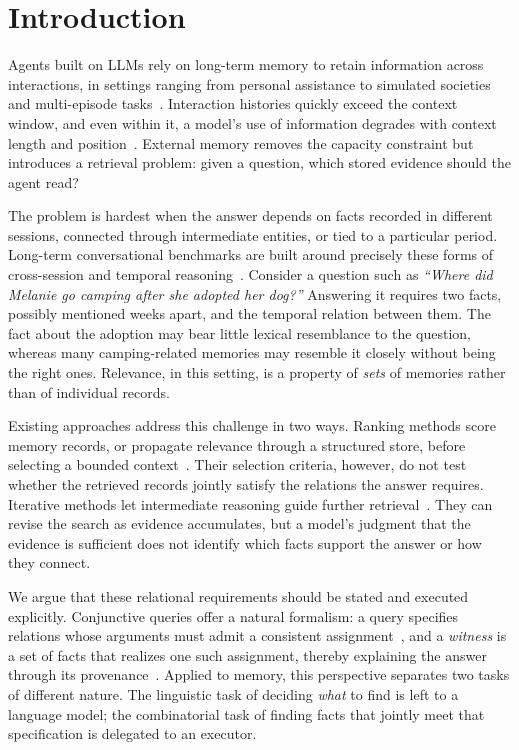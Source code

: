 \section{Introduction}
\label{sec:intro}

Agents built on \acp{LLM} rely on long-term memory to retain information
across interactions, in settings ranging from personal assistance to
simulated societies and multi-episode
tasks~\cite{park2023generative,packer2023memgpt,sumers2024coala,zhang2025survey}.
Interaction histories quickly exceed the context window, and even within
it, a model's use of information degrades with context length and
position~\cite{liu2024lost,hsieh2024ruler}. External memory removes the
capacity constraint but introduces a retrieval problem: given a question,
which stored evidence should the agent read?

The problem is hardest when the answer depends on facts recorded in
different sessions, connected through intermediate entities, or tied to
a particular period. Long-term conversational benchmarks are built
around precisely these forms of cross-session and temporal
reasoning~\cite{maharana2024locomo,wu2025longmemeval}. Consider a question
such as \emph{``Where did Melanie go camping after she adopted her dog?''}
Answering it requires two facts, possibly mentioned weeks apart, and the
temporal relation between them. The fact about the adoption may bear
little lexical resemblance to the question, whereas many camping-related
memories may resemble it closely without being the right ones. Relevance,
in this setting, is a property of \emph{sets} of memories rather than of
individual records.

Existing approaches address this challenge in two ways. Ranking methods
score memory records, or propagate relevance through a structured store,
before selecting a bounded
context~\cite{park2023generative,zhong2024memorybank,chhikara2025mem0,gutierrez2024hipporag}.
Their selection criteria, however, do not test whether the retrieved
records jointly satisfy the relations the answer requires. Iterative
methods let intermediate reasoning guide further
retrieval~\cite{trivedi2023ircot,asai2024selfrag,jeong2024adaptiverag,yan2025gam}.
They can revise the search as evidence accumulates, but a model's judgment
that the evidence is sufficient does not identify which facts support
the answer or how they connect.

We argue that these relational requirements should be stated and executed
explicitly. Conjunctive queries offer a natural formalism: a query
specifies relations whose arguments must admit a consistent
assignment~\cite{chandra1977conjunctive}, and a \emph{witness} is a set of
facts that realizes one such assignment, thereby explaining the answer
through its provenance~\cite{buneman2001why,green2007provenance}. Applied
to memory, this perspective separates two tasks of different nature. The
linguistic task of deciding \emph{what} to find is left to a language
model; the combinatorial task of finding facts that jointly meet that
specification is delegated to an executor.

